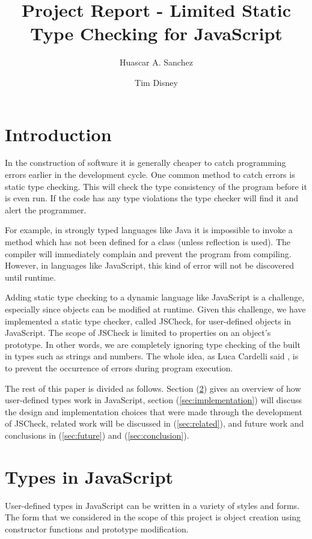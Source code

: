 \documentclass{article}
\begin{document}
\title{Project Report - Limited Static Type Checking for JavaScript}
\author{Huascar A. Sanchez \and Tim Disney}

\maketitle

\lstset{showstringspaces=false}

\section{Introduction}
In the construction of software it is generally cheaper to 
catch programming errors earlier in the development cycle. One common method 
to catch errors is static type checking. This will
check the type consistency of the program before it is even
run. If the code has any type violations the type checker will 
find it and alert the programmer.

For example, in strongly typed languages like Java it is impossible 
to invoke a method which has not been defined for a class (unless reflection is used).
The compiler will immediately 
complain and prevent the program from compiling. However, in languages like 
JavaScript, this kind of error will not be discovered until runtime.

Adding static type checking to a dynamic language like JavaScript is a 
challenge, especially since objects can be modified at runtime. Given this challenge, 
we have implemented a static type checker, called JSCheck, for user-defined objects 
in JavaScript. The scope of JSCheck is limited to properties on an object's
prototype. In other words, we are completely ignoring type checking of the built in types
such as strings and numbers. The whole idea, as Luca Cardelli said \cite{typesystems}, 
is to prevent the occurrence of errors during program execution. 

The rest of this paper is divided as follows. Section (\ref{sec:types}) gives an overview
of how user-defined types work in JavaScript, section (\ref{sec:implementation}) 
will discuss the design and implementation choices that were made through the development 
of JSCheck, related work will be discussed in (\ref{sec:related}), and future work
and conclusions in (\ref{sec:future}) and (\ref{sec:conclusion}).


\section{Types in JavaScript}
\label{sec:types}
User-defined types in JavaScript can be written in a variety of styles and forms. The form
that we considered in the scope of this project is object creation using 
constructor functions and prototype modification.
\end{document}
